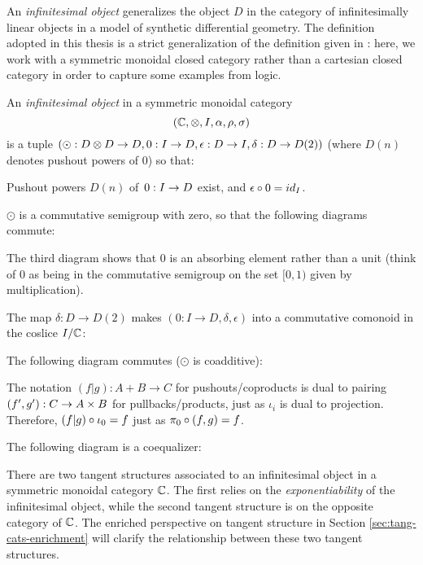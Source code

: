 An \emph{infinitesimal object} generalizes the object $D$ in the category of infinitesimally linear objects in a model of synthetic differential geometry. The definition adopted in this thesis is a strict generalization of the definition given in \cite{Cockett2014}: here, we work with a symmetric monoidal closed category rather than a cartesian closed category in order to capture some examples from logic.
\begin{definition}
    \label{def:inf-object}
    An \emph{infinitesimal object} in a symmetric monoidal category \[(\mathbb{C}, \otimes, I, \alpha, \rho, \sigma)\] is a tuple $(\odot:D \otimes D \to D, 0:I \to D, \epsilon: D \to I, \delta: D \to D(2))$ (where $D(n)$ denotes pushout powers of $0$) so that:
    \begin{enumerate}[{[{I}O.1]}]
        \item Pushout powers $D(n)$ of $\hspace{0.05cm} 0:I \to D$ exist, and $\epsilon \circ 0 = id_I$.
        \item $\odot$ is a commutative semigroup with zero, so that the following diagrams commute:
        
        The third diagram shows that $0$ is an absorbing element rather than a unit (think of $0$ as being in the commutative semigroup on the set $[0,1)$ given by multiplication).
        \item The map $\delta: D \to D(2)$ makes $(0:I \to D, \delta, \epsilon)$ into a commutative comonoid in the coslice $I/\mathbb{C}$:
        
        \item The following diagram commutes ($\odot$ is coadditive):
        
        The notation $(f | g):A + B \to C$ for pushouts/coproducts is dual to pairing $(f',g'):C \to A \times B$ for pullbacks/products, just as $\iota_i$ is dual to projection. Therefore, $(f | g) \circ \iota_0 = f$ just as $\pi_0 \circ (f,g) = f$.
        \item The following diagram is a coequalizer:
        
    \end{enumerate} 
\end{definition}
There are two tangent structures associated to an infinitesimal object in a symmetric monoidal category $\mathbb{C}$. The first relies on the \emph{exponentiability} of the infinitesimal object, while the second tangent structure is on the opposite category of $\mathbb{C}$. The enriched perspective on tangent structure in Section \ref{sec:tang-cats-enrichment} will clarify the relationship between these two tangent structures.
